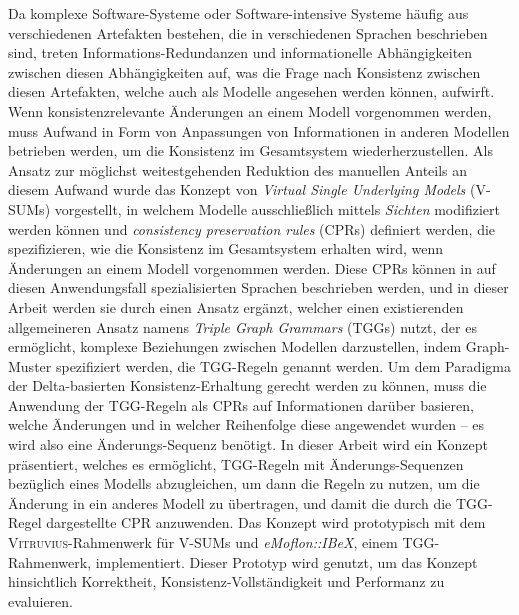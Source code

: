 
\Abstract
Da komplexe Software-Systeme oder Software-intensive Systeme häufig aus verschiedenen Artefakten bestehen, die in verschiedenen Sprachen beschrieben sind, treten Informations-Redundanzen und informationelle Abhängigkeiten zwischen diesen Abhängigkeiten auf, was die Frage nach Konsistenz zwischen diesen Artefakten, welche auch als Modelle angesehen werden können, aufwirft.
Wenn konsistenzrelevante Änderungen an einem Modell vorgenommen werden, muss Aufwand in Form von Anpassungen von Informationen in anderen Modellen betrieben werden, um die Konsistenz im Gesamtsystem wiederherzustellen. 
Als Ansatz zur möglichst weitestgehenden Reduktion des manuellen Anteils an diesem Aufwand wurde das Konzept von \emph{Virtual Single Underlying Models} (V-SUMs) vorgestellt, in welchem Modelle ausschließlich mittels \emph{Sichten} modifiziert werden können und \emph{consistency preservation rules} (CPRs) definiert werden, die spezifizieren, wie die Konsistenz im Gesamtsystem erhalten wird, wenn Änderungen an einem Modell vorgenommen werden.
Diese CPRs können in auf diesen Anwendungsfall spezialisierten Sprachen beschrieben werden, und in dieser Arbeit werden sie durch einen  Ansatz ergänzt, welcher einen existierenden allgemeineren Ansatz namens \emph{Triple Graph Grammars} (TGGs) nutzt, der es ermöglicht, komplexe Beziehungen zwischen Modellen darzustellen, indem Graph-Muster spezifiziert werden, die TGG-Regeln genannt werden.
Um dem Paradigma der Delta-basierten Konsistenz-Erhaltung gerecht werden zu können, muss die Anwendung der TGG-Regeln als CPRs auf Informationen darüber basieren, welche Änderungen und in welcher Reihenfolge diese angewendet wurden -- es wird also eine Änderungs-Sequenz benötigt.
In dieser Arbeit wird ein Konzept präsentiert, welches es ermöglicht, TGG-Regeln mit Änderungs-Sequenzen bezüglich eines Modells abzugleichen, um dann die Regeln zu nutzen, um die Änderung in ein anderes Modell zu übertragen, und damit die durch die TGG-Regel dargestellte CPR anzuwenden.
Das Konzept wird prototypisch mit dem \textsc{Vitruvius}-Rahmenwerk für V-SUMs und \emph{eMoflon::IBeX}, einem TGG-Rahmenwerk, implementiert.
Dieser Prototyp wird genutzt, um das Konzept hinsichtlich Korrektheit, Konsistenz-Vollständigkeit und Performanz zu evaluieren.
